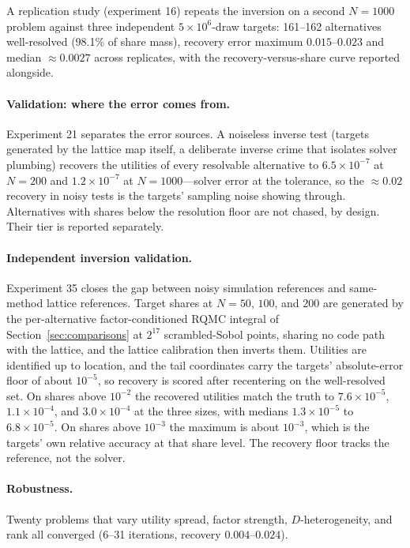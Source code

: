 \documentclass[12pt]{article}
\theoremstyle{remark}
\begin{document}
A replication study (experiment
16) repeats the inversion on a second $N=1000$ problem against three
independent $5\times10^6$-draw targets: 161--162
alternatives well-resolved (98.1\% of share mass), recovery error maximum
$0.015$--$0.023$ and median $\approx 0.0027$ across replicates, with the
recovery-versus-share curve reported alongside.

\paragraph{Validation: where the error comes from.} Experiment 21
separates the error sources. A noiseless inverse
test (targets generated by the lattice map itself, a deliberate inverse
crime that isolates solver plumbing) recovers the utilities of every
resolvable alternative to $6.5\times10^{-7}$ at $N=200$ and
$1.2\times10^{-7}$ at $N=1000$---solver error at the tolerance, so the
$\approx 0.02$ recovery in noisy tests is the targets' sampling noise
showing through. Alternatives with shares below the resolution floor are not
chased, by design. Their tier is reported separately.

\paragraph{Independent inversion validation.} Experiment 35 closes the
gap between noisy simulation references and same-method lattice
references. Target shares at $N = 50$, $100$, and $200$ are generated
by the per-alternative factor-conditioned RQMC integral of
Section~\ref{sec:comparisons} at $2^{17}$ scrambled-Sobol points,
sharing no code path with the lattice, and the lattice calibration then
inverts them. Utilities are identified up to location, and the tail
coordinates carry the targets' absolute-error floor of about $10^{-5}$,
so recovery is scored after recentering on the well-resolved set. On
shares above $10^{-2}$ the recovered utilities match the truth to
$7.6\times10^{-5}$, $1.1\times10^{-4}$, and $3.0\times10^{-4}$ at the
three sizes, with medians $1.3\times10^{-5}$ to $6.8\times10^{-5}$. On
shares above $10^{-3}$ the maximum is about $10^{-3}$, which is the
targets' own relative accuracy at that share level. The recovery floor
tracks the reference, not the solver.

\paragraph{Robustness.} Twenty problems that vary utility spread, factor
strength, $D$-heterogeneity, and rank all converged (6--31 iterations, recovery
$0.004$--$0.024$).
\end{document}
